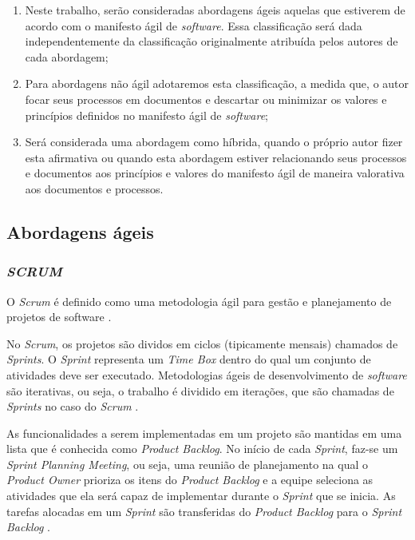 \documentclass{acm_proc_article-sp}
\begin{document}
\begin{enumerate}
\item  Neste trabalho, serão consideradas abordagens ágeis aquelas que estiverem de acordo com o manifesto ágil de \textit{software}. Essa classificação será dada independentemente da classificação originalmente atribuída pelos autores de cada abordagem;
\item Para abordagens não ágil adotaremos esta classificação, a medida que, o autor focar seus processos em documentos e descartar ou minimizar os valores e princípios definidos no manifesto ágil de \textit{software};
\item Será considerada uma abordagem como híbrida, quando o próprio autor fizer esta afirmativa ou quando esta abordagem estiver relacionando seus processos e documentos aos princípios e valores do manifesto ágil de maneira valorativa aos documentos e processos.
\end{enumerate}

\subsection{Abordagens ágeis}

\subsubsection{\textit{SCRUM}}
O \textit{Scrum} é definido como uma metodologia ágil para gestão e planejamento de projetos de software \cite{scrum:agil}.

No \textit{Scrum}, os projetos são dividos em ciclos (tipicamente mensais) chamados de \textit{Sprints}. O \textit{Sprint} representa um \textit{Time Box} dentro do qual um conjunto de atividades deve ser executado. Metodologias ágeis de desenvolvimento de \textit{software} são iterativas, ou seja, o trabalho é dividido em iterações, que são chamadas de \textit{Sprints} no caso do \textit{Scrum} \cite{scrum:agil}.

As funcionalidades a serem implementadas em um projeto são mantidas em uma lista que é conhecida como \textit{Product Backlog}. No início de cada \textit{Sprint}, faz-se um \textit{Sprint Planning Meeting}, ou seja, uma reunião de planejamento na qual o \textit{Product Owner} prioriza os itens do \textit{Product Backlog} e a equipe seleciona as atividades que ela será capaz de implementar durante o \textit{Sprint} que se inicia. As tarefas alocadas em um \textit{Sprint} são transferidas do \textit{Product Backlog} para o \textit{Sprint Backlog} \cite{scrum:agil}.
\end{document}
